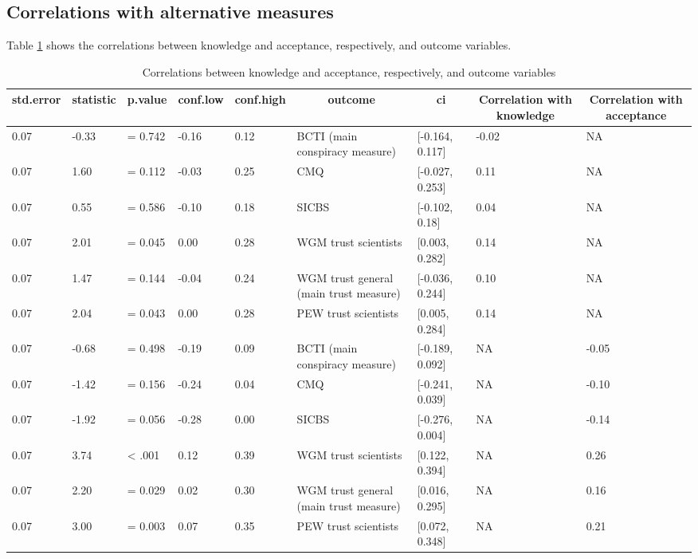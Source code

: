 \documentclass[
  doc,floatsintext]{apa6}
\begin{document}
\subsection{Correlations with alternative measures}\label{correlations-with-alternative-measures-3}

Table \ref{tab:exp4-correlations-outcomes} shows the correlations between knowledge and acceptance, respectively, and outcome variables.

\begin{table}[tbp]

\begin{center}
\begin{threeparttable}

\caption{\label{tab:exp4-correlations-outcomes}Correlations between knowledge and acceptance, respectively, and outcome variables}

\begin{tabular}{lllllllll}
\toprule
std.error & \multicolumn{1}{c}{statistic} & \multicolumn{1}{c}{p.value} & \multicolumn{1}{c}{conf.low} & \multicolumn{1}{c}{conf.high} & \multicolumn{1}{c}{outcome} & \multicolumn{1}{c}{ci} & \multicolumn{1}{c}{Correlation with knowledge} & \multicolumn{1}{c}{Correlation with acceptance}\\
\midrule
0.07 & -0.33 & = 0.742 & -0.16 & 0.12 & BCTI 
(main conspiracy measure) & {}[-0.164, 0.117] & -0.02 & NA\\
0.07 & 1.60 & = 0.112 & -0.03 & 0.25 & CMQ & {}[-0.027, 0.253] & 0.11 & NA\\
0.07 & 0.55 & = 0.586 & -0.10 & 0.18 & SICBS & {}[-0.102, 0.18] & 0.04 & NA\\
0.07 & 2.01 & = 0.045 & 0.00 & 0.28 & WGM trust scientists & {}[0.003, 0.282] & 0.14 & NA\\
0.07 & 1.47 & = 0.144 & -0.04 & 0.24 & WGM trust general 
(main trust measure) & {}[-0.036, 0.244] & 0.10 & NA\\
0.07 & 2.04 & = 0.043 & 0.00 & 0.28 & PEW trust scientists & {}[0.005, 0.284] & 0.14 & NA\\
0.07 & -0.68 & = 0.498 & -0.19 & 0.09 & BCTI 
(main conspiracy measure) & {}[-0.189, 0.092] & NA & -0.05\\
0.07 & -1.42 & = 0.156 & -0.24 & 0.04 & CMQ & {}[-0.241, 0.039] & NA & -0.10\\
0.07 & -1.92 & = 0.056 & -0.28 & 0.00 & SICBS & {}[-0.276, 0.004] & NA & -0.14\\
0.07 & 3.74 & < .001 & 0.12 & 0.39 & WGM trust scientists & {}[0.122, 0.394] & NA & 0.26\\
0.07 & 2.20 & = 0.029 & 0.02 & 0.30 & WGM trust general 
(main trust measure) & {}[0.016, 0.295] & NA & 0.16\\
0.07 & 3.00 & = 0.003 & 0.07 & 0.35 & PEW trust scientists & {}[0.072, 0.348] & NA & 0.21\\
\bottomrule
\end{tabular}

\end{threeparttable}
\end{center}

\end{table}
\end{document}
